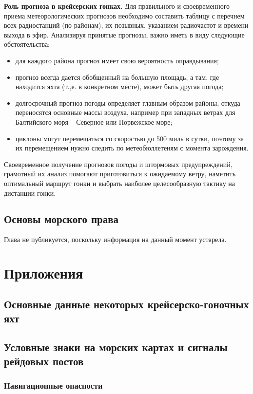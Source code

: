\documentclass[a4paper, 12pt, twoside, final, book, russian, fittopage, cyremdash]{ncc}
\begin{document}
\textbf{Роль прогноза в крейсерских гонках.} Для правильного и своевременного приема метеорологических прогнозов необходимо составить таблицу с перечнем всех радиостанций (по районам), их позывных, указанием радиочастот и времени выхода в эфир. Анализируя принятые прогнозы, важно иметь в виду следующие обстоятельства: 
\begin{itemize}
\item для каждого района прогноз имеет свою вероятность оправдывания; 
\item прогноз всегда дается обобщенный на большую площадь, а там, где находится яхта (т.\=,е. в конкретном месте), может быть другая погода; 
\item долгосрочный прогноз погоды определяет главным образом районы, откуда переносятся основные массы воздуха, например при западных ветрах для Балтийского моря \--- Северное или Норвежское море; 
\item циклоны могут перемещаться со скоростью до 500 миль в сутки, поэтому за их перемещением нужно следить по метеобюллетеням с момента зарождения. 
\end{itemize}

Своевременное получение прогнозов погоды и штормовых предупреждений, грамотный их анализ помогают приготовиться к ожидаемому ветру, наметить оптимальный маршрут гонки и выбрать наиболее целесообразную тактику на дистанции гонки.

\chapter{Основы морского права}

Глава не публикуется, поскольку информация на данный момент устарела.

\part{Приложения}

\chapter{Основные данные некоторых крейсерско-гоночных яхт}\label{app:1}

\chapter{Условные знаки на морских картах и сигналы рейдовых постов}\label{app:2}

\section{Навигационные опасности}\label{app:2a}
\end{document}
